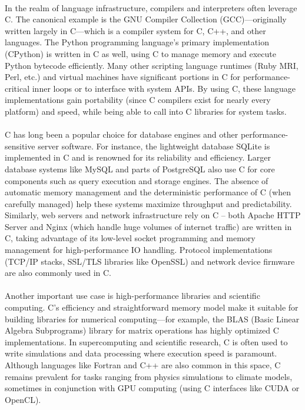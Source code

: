 \documentclass{article}
\begin{document}
\\
{\normalsize In the realm of language infrastructure, compilers and interpreters often leverage C. The canonical example is the GNU Compiler Collection (GCC)—originally written largely in C—which is a compile}{\normalsize r system for C, C++, and other languages. The Python programming language's primary implementation (}{\normalsize CPython}{\normalsize ) is written in C as well, using C to manage memory and execute Python bytecode efficiently. Many other scripting language runtimes (Ruby MRI, Perl, }{\normalsize etc.) and virtual machines have significant portions in C for performance-critical inner loops or to interface with system APIs. By using C, these language implementations gain portability (since C compilers exist for nearly every platform) and speed, whil}{\normalsize e being able to call into C libraries for system tasks.}\\
\\
{\normalsize C has long been a popular choice for database engines and other performance-sensitive server software. For instance, the lightweight database SQLite is implemented in C and is renowned for its reliab}{\normalsize ility and efficiency. Larger database systems like MySQL and parts of PostgreSQL also use C for core components such as query execution and storage engines. The absence of automatic memory management and the deterministic performance of C (when carefully m}{\normalsize anaged) help these systems maximize throughput and predictability. Similarly, web servers and network infrastructure rely on C – both Apache HTTP Server and Nginx (which handle huge volumes of internet traffic) are written in C, taking advantage of its low}{\normalsize -level socket programming and memory management for high-performance IO handling. Protocol implementations (TCP/IP stacks, SSL/TLS libraries like OpenSSL) and network device firmware are also commonly used in C.}\\
\\
{\normalsize Another important use case is high-performa}{\normalsize nce libraries and scientific computing. C's efficiency and straightforward memory model make it suitable for building libraries for numerical computing—for example, the BLAS (Basic Linear Algebra Subprograms) library for matrix operations has highly optimi}{\normalsize zed C implementations. In supercomputing and scientific research, C is often used to write simulations and data processing where execution }{\normalsize speed is paramount. Although languages like Fortran and C++ are also common in this space, C remains prevalent for ta}{\normalsize sks ranging from physics simulations to climate models, sometimes in conjunction with GPU computing (using C interfaces like CUDA or OpenCL).}\\
\end{document}
